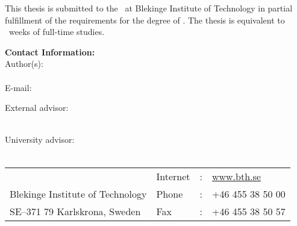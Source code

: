 \documentclass[oneside]{bthdiss} %
\begin{document}
{
	\setlength{\parindent}{0pt}
	\changepage{5cm}{1cm}{-0.5cm}{-0.5cm}{}{-2cm}{}{}{} %

	\begin{small}
		This thesis is submitted to the \bthdissdept\ at Blekinge Institute of Technology in partial fulfillment of the requirements for the degree of \bthdissdegree . The thesis is equivalent to \bthdissnumweeks\ weeks of full-time studies.
	\end{small}

	\vfill %

	\textbf{Contact Information:}\\
	Author(s):\\
	\bthdissfirstname\ \bthdisslastname \\
	E-mail: \bthdissemail 

	\bigskip

	External advisor: \\
	\bthdissadvisorext \\
	\bthdissadvisorextorg 

	\bigskip

	University advisor:\\
	\bthdissadvisoruni \\
	\bthdissdept

	\vfill

	\begin{tabular}{p{}lcl}
		\bthdissdept						& Internet	& : & \href{http://www.bth.se}{www.bth.se}\\
		Blekinge Institute of Technology	& Phone		& : & +46 455 38 50 00\\
		SE--371 79 Karlskrona, Sweden		& Fax		& : & +46 455 38 50 57\\
	\end{tabular}

	\bigskip \bigskip \bigskip %

	\clearpage
}

\pagestyle{plain}
\setcounter{page}{1}
\end{document}
